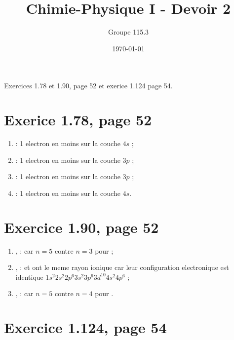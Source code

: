 \documentclass{article}
\title{Chimie-Physique I - Devoir 2}
\author{Groupe 115.3}
\date{\today}
\begin{document}
\maketitle

Exercices 1.78 et 1.90, page 52 et exerice 1.124 page 54.

\section{Exerice 1.78, page 52}

\begin{enumerate}
  \item {} : 1 electron en moins sur la couche $4s$ ;
  \item {} : 1 electron en moins sur la couche $3p$ ;
  \item {} : 1 electron en moins sur la couche $3p$ ;
  \item {} : 1 electron en moins sur la couche $4s$.
\end{enumerate}

\section{Exercice 1.90, page 52}

\begin{enumerate}
	\item {},  :  car $n = 5$ contre $n = 3$ pour  ;
	\item {},  :  et  ont le meme rayon 	ionique car leur configuration electronique est identique $1s^2 2s^2 2p^6 3s^2 3p^6 3d^{10}4s^2 4p^6$ ;
	\item {},  :  car $n = 5$ contre $n = 4$ pour .
\end{enumerate}

\section{Exercice 1.124, page 54}

\end{document}
